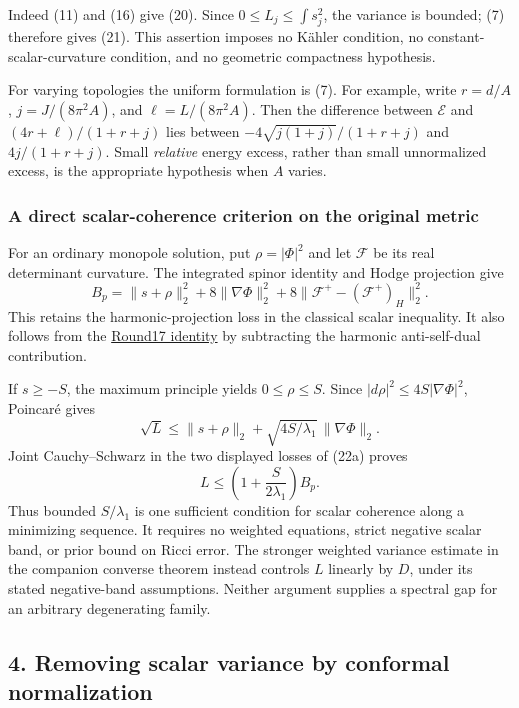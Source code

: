 \documentclass[
  11pt,
]{article}
\begin{document}
Indeed (11) and (16) give (20). Since \(0\le L_j\le\int s_j^2\), the
variance is bounded; (7) therefore gives (21). This assertion imposes no
Kähler condition, no constant-scalar-curvature condition, and no
geometric compactness hypothesis.

For varying topologies the uniform formulation is (7). For example,
write \(r=d/A\), \(j=J/(8\pi^2A)\), and \(\ell=L/(8\pi^2A)\). Then the
difference between \(\mathcal E\) and \((4r+\ell)/(1+r+j)\) lies between
\(-4\sqrt{j(1+j)}/(1+r+j)\) and \(4j/(1+r+j)\). Small \emph{relative}
energy excess, rather than small unnormalized excess, is the appropriate
hypothesis when \(A\) varies.

\hypertarget{a-direct-scalar-coherence-criterion-on-the-original-metric}{%
\subsubsection{A direct scalar-coherence criterion on the original
metric}\label{a-direct-scalar-coherence-criterion-on-the-original-metric}}

For an ordinary monopole solution, put \(\rho=|\Phi|^2\) and let
\(\mathcal F\) be its real determinant curvature. The integrated spinor
identity and Hodge projection give \[
 B_p=\|s+\rho\|_2^2+8\|\nabla\Phi\|_2^2+
        8\|\mathcal F^+-(\mathcal F^+)_H\|_2^2.
 \tag{22a}
\] This retains the harmonic-projection loss in the classical scalar
inequality. It also follows from the \href{round17_integral.md}{Round17
identity} by subtracting the harmonic anti-self-dual contribution.

If \(s\ge-S\), the maximum principle yields \(0\le\rho\le S\). Since
\(|d\rho|^2\le4S|\nabla\Phi|^2\), Poincaré gives \[
 \sqrt L\le\|s+\rho\|_2+
       \sqrt{4S/\lambda_1}\,\|\nabla\Phi\|_2.
\] Joint Cauchy--Schwarz in the two displayed losses of (22a) proves \[
 \boxed{L\le\left(1+\frac{S}{2\lambda_1}\right)B_p.}
 \tag{22b}
\] Thus bounded \(S/\lambda_1\) is one sufficient condition for scalar
coherence along a minimizing sequence. It requires no weighted
equations, strict negative scalar band, or prior bound on Ricci error.
The stronger weighted variance estimate in the companion converse
theorem instead controls \(L\) linearly by \(D\), under its stated
negative-band assumptions. Neither argument supplies a spectral gap for
an arbitrary degenerating family.

\hypertarget{removing-scalar-variance-by-conformal-normalization}{%
\subsection{4. Removing scalar variance by conformal
normalization}\label{removing-scalar-variance-by-conformal-normalization}}
\end{document}
